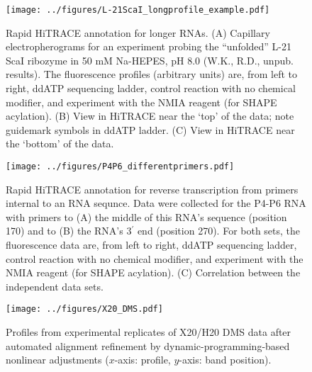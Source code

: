 \documentclass[letter]{bioinfo}
\begin{document}

%
%



\newpage

\begin{figure}
\centering
    \texttt{[image: ../figures/L-21ScaI\_longprofile\_example.pdf]}
\caption{Rapid  HiTRACE annotation for longer RNAs. (A) Capillary electropherograms for an experiment probing the ``unfolded'' L-21 ScaI ribozyme in 50 mM Na-HEPES, pH 8.0 (W.K., R.D., unpub. results). The fluorescence profiles (arbitrary units) are, from left to right, ddATP sequencing ladder, control reaction with no chemical modifier, and experiment with the NMIA reagent (for SHAPE acylation). (B) View in HiTRACE near the `top' of the data; note guidemark symbols in ddATP ladder. (C) View in HiTRACE near the `bottom' of the data.}
\label{f:L21-400nt}
\end{figure}

\begin{figure}
\centering
    \texttt{[image: ../figures/P4P6\_differentprimers.pdf]}
\caption{Rapid HiTRACE annotation for reverse transcription from primers internal to an RNA sequnce. Data were collected for the P4-P6 RNA with primers to (A) the middle of this RNA's sequence (position 170) and to (B) the RNA's 3$^\prime$ end (position 270). For both sets, the fluorescence data are, from left to right, ddATP sequencing ladder, control reaction with no chemical modifier, and experiment with the NMIA reagent (for SHAPE acylation). (C) Correlation between the independent data sets.}
\label{f:P4P6-internal-prim}
\end{figure}
\newpage

\begin{figure*}
\centering
    \texttt{[image: ../figures/X20\_DMS.pdf]}
\caption{Profiles from experimental replicates of X20/H20 DMS data after automated alignment refinement by dynamic-programming-based nonlinear adjustments ($x$-axis: profile, $y$-axis: band position).}
\label{f:x20-dms}
\end{figure*}
\end{document}

